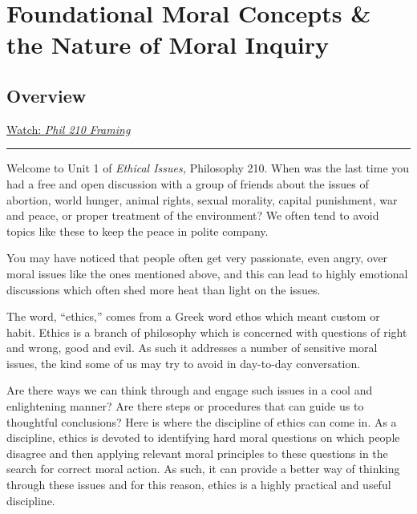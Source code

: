 \documentclass[
]{book}
\begin{document}
\hypertarget{foundational-moral-concepts-the-nature-of-moral-inquiry}{%
\chapter{Foundational Moral Concepts \& the Nature of Moral Inquiry}\label{foundational-moral-concepts-the-nature-of-moral-inquiry}}

\hypertarget{overview}{%
\section*{Overview}\label{overview}}

\href{https://vimeo.com/861713419/4d5e72685d}{Watch: \emph{Phil 210 Framing}}

\begin{center}\rule{0.5\linewidth}{0.5pt}\end{center}

Welcome to Unit 1 of \emph{Ethical Issues,} Philosophy 210. When was the last time you had a free and open discussion with a group of friends about the issues of abortion, world hunger, animal rights, sexual morality, capital punishment, war and peace, or proper treatment of the environment? We often tend to avoid topics like these to keep the peace in polite company.

You may have noticed that people often get very passionate, even angry, over moral issues like the ones mentioned above, and this can lead to highly emotional discussions which often shed more heat than light on the issues.

The word, ``ethics,'' comes from a Greek word ethos which meant custom or habit. Ethics is a branch of philosophy which is concerned with questions of right and wrong, good and evil. As such it addresses a number of sensitive moral issues, the kind some of us may try to avoid in day-to-day conversation.

Are there ways we can think through and engage such issues in a cool and enlightening manner? Are there steps or procedures that can guide us to thoughtful conclusions? Here is where the discipline of ethics can come in. As a discipline, ethics is devoted to identifying hard moral questions on which people disagree and then applying relevant moral principles to these questions in the search for correct moral action. As such, it can provide a better way of thinking through these issues and for this reason, ethics is a highly practical and useful discipline.
\end{document}
